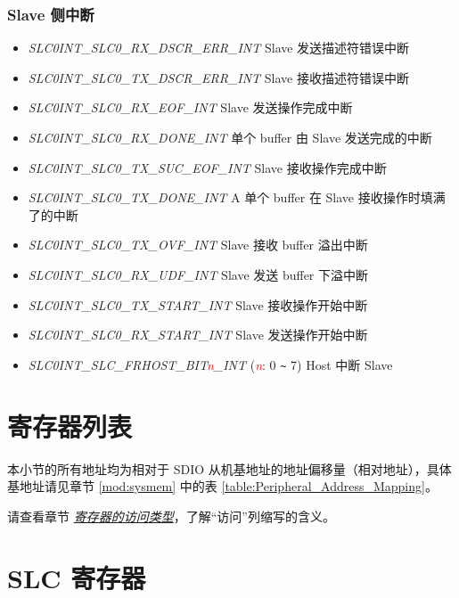 \documentclass[main\_\_CN.tex]{subfiles}
\begin{document}
\subsubsection{Slave 侧中断}
\begin{itemize}
\item {\it SLC0INT\_SLC0\_RX\_DSCR\_ERR\_INT} Slave 发送描述符错误中断
\item {\it SLC0INT\_SLC0\_TX\_DSCR\_ERR\_INT} Slave 接收描述符错误中断
\item {\it SLC0INT\_SLC0\_RX\_EOF\_INT} Slave 发送操作完成中断
\item {\it SLC0INT\_SLC0\_RX\_DONE\_INT} 单个 buffer 由 Slave 发送完成的中断
\item {\it SLC0INT\_SLC0\_TX\_SUC\_EOF\_INT} Slave 接收操作完成中断
\item {\it SLC0INT\_SLC0\_TX\_DONE\_INT} A 单个 buffer 在 Slave 接收操作时填满了的中断
\item {\it SLC0INT\_SLC0\_TX\_OVF\_INT} Slave 接收 buffer 溢出中断
\item {\it SLC0INT\_SLC0\_RX\_UDF\_INT} Slave 发送 buffer 下溢中断
\item {\it SLC0INT\_SLC0\_TX\_START\_INT} Slave 接收操作开始中断
\item {\it SLC0INT\_SLC0\_RX\_START\_INT} Slave 发送操作开始中断
\item {\it SLC0INT\_SLC\_FRHOST\_BIT\textcolor{red}{\it{n}}\_INT\label{int:SLC0INTSLCFRHOSTBITnINT}} (\textcolor{red}{\it{n}}: 0 \verb+~+ 7) Host 中断 Slave
\end{itemize}

\hypertarget{sdioslave-reg-summ}{}
\section{寄存器列表}\label{sec:sdioslave-reg-summ}

本小节的所有地址均为相对于 SDIO 从机基地址的地址偏移量（相对地址），具体基地址请见章节 \ref{mod:sysmem} \textit{} 中的表 \ref{table:Peripheral_Address_Mapping}。

请查看章节 \hyperref[glossary-access-types]{\textit{寄存器的访问类型}}，了解“访问”列缩写的含义。



{\clearpage}
\section{SLC 寄存器}
\end{document}
